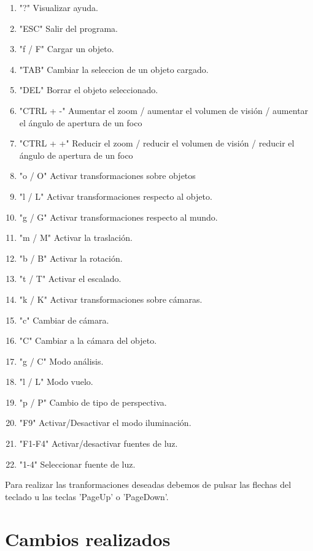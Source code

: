 \documentclass[12pt,a4paper]{article}
\begin{document}
\begin{enumerate}
\item "?"		 		 Visualizar ayuda.
\item "ESC"		 		 Salir del programa.
\item "f / F"				 Cargar un objeto.
\item "TAB"		 		 Cambiar la seleccion de un objeto cargado.
\item "DEL"				 Borrar el objeto seleccionado.
\item "CTRL + -"	Aumentar el zoom / aumentar el volumen de visión / aumentar el ángulo de apertura de un foco
\item "CTRL + +"	Reducir el zoom / reducir el volumen de visión / reducir el ángulo de apertura de un foco
\item "o / O"      Activar transformaciones sobre objetos
\item "l / L"		 	 Activar transformaciones respecto al objeto.
\item "g / G"		 	 Activar transformaciones respecto al mundo.
\item "m / M"		 	 Activar la traslación.
\item "b / B"			 Activar la rotación.
\item "t / T"		 	 Activar el escalado.
\item "k / K"      Activar transformaciones sobre cámaras.
\item "c"          Cambiar de cámara.
\item "C"          Cambiar a la cámara del objeto.
\item "g / C"      Modo análisis.
\item "l / L"      Modo vuelo.
\item "p / P"      Cambio de tipo de perspectiva.
\item "F9"         Activar/Desactivar el modo iluminación.
\item "F1-F4"      Activar/desactivar fuentes de luz.
\item "1-4"        Seleccionar fuente de luz.
\end{enumerate}

Para realizar las tranformaciones deseadas debemos de pulsar las flechas del teclado u las teclas 'PageUp' o 'PageDown'.\newline

\section{Cambios realizados}
\end{document}
